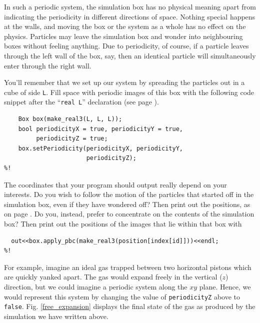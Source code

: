 In such a periodic system, the simulation box has no physical meaning apart from 
indicating the periodicity in different directions of space. Nothing special 
happens at the walls, and moving the box or the system as a whole has no effect 
on the physics. Particles may leave the simulation box and wonder into 
neighbouring boxes without feeling anything. Due to periodicity, of course, if a 
particle leaves through the left wall of the box, say, then an identical 
particle will simultaneously enter through the right wall.

You'll remember that we set up our system by spreading the particles out in a
cube of side \texttt{L}. Fill space with periodic images of this box with the
following code snippet after the ``\texttt{real L}'' declaration (see page
\pageref{initialConditions}).
\begin{lstlisting}
    Box box(make_real3(L, L, L));
    bool periodicityX = true, periodicityY = true,
         periodicityZ = true;
    box.setPeriodicity(periodicityX, periodicityY,
                       periodicityZ);
%!
\end{lstlisting}
The coordinates that your program should output really depend on your interests. 
Do you wish to follow the motion of the particles that started off in the 
simulation box, even if they have wondered off? Then print out the positions, as 
on page \pageref{particlePositions}. Do you, instead, prefer to concentrate on 
the contents of the simulation box? Then print out the positions of the images 
that lie within that box with
\begin{lstlisting}
  out<<box.apply_pbc(make_real3(position[index[id]]))<<endl;
%!
\end{lstlisting}

For example, imagine an ideal gas trapped between two horizontal pistons which
are quickly yanked apart. The gas would expand freely in the vertical ($z$)
direction, but we could imagine a periodic system along the $xy$ plane. Hence,
we would represent this system by changing the value of \texttt{periodicityZ}
above to \texttt{false}. Fig. \ref{free_expansion} displays the final state of
the gas as produced by the simulation we have written above.


